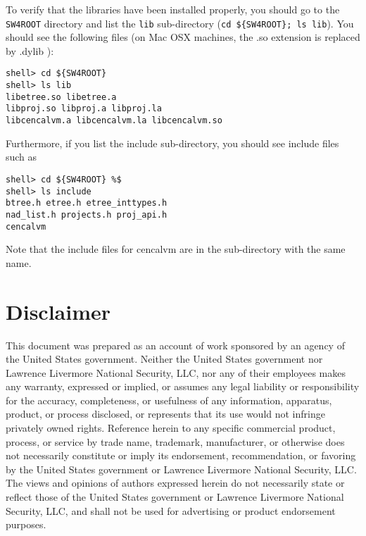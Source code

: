 \documentclass[11pt]{article}
\begin{document}
To verify that the libraries have been installed properly, you should go to the \verb+SW4ROOT+
directory and list the {\tt lib} sub-directory (\verb+cd ${SW4ROOT}; ls lib+). You should see the
following files (on Mac OSX machines, the .so extension is replaced by .dylib ):
\begin{verbatim}
shell> cd ${SW4ROOT}
shell> ls lib
libetree.so libetree.a 
libproj.so libproj.a libproj.la 
libcencalvm.a libcencalvm.la libcencalvm.so 
\end{verbatim}
Furthermore, if you list the include sub-directory, you should see include files such as 
\begin{verbatim}
shell> cd ${SW4ROOT} %$
shell> ls include
btree.h etree.h etree_inttypes.h
nad_list.h projects.h proj_api.h
cencalvm
\end{verbatim}
Note that the include files for cencalvm are in the sub-directory with the same name.

\section{Disclaimer} 
This document was prepared as an account of work sponsored by an agency of the United States
government. Neither the United States government nor Lawrence Livermore National Security, LLC, nor
any of their employees makes any warranty, expressed or implied, or assumes any legal liability or
responsibility for the accuracy, completeness, or usefulness of any information, apparatus, product,
or process disclosed, or represents that its use would not infringe privately owned
rights. Reference herein to any specific commercial product, process, or service by trade name,
trademark, manufacturer, or otherwise does not necessarily constitute or imply its endorsement,
recommendation, or favoring by the United States government or Lawrence Livermore National Security,
LLC. The views and opinions of authors expressed herein do not necessarily state or reflect those of
the United States government or Lawrence Livermore National Security, LLC, and shall not be used for
advertising or product endorsement purposes. 



 
\end{document}
